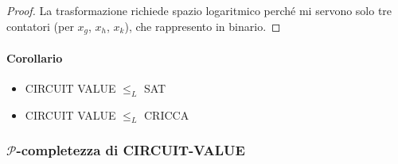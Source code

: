 \documentclass[a4paper,10pt,oneside]{article}
\theoremstyle{break}
\begin{document}
\begin{mdframed}
\begin{proof}
 La trasformazione richiede spazio logaritmico perché mi servono solo tre contatori (per $x_g$, $x_h$, $x_k$), che rappresento in binario.
\end{proof}

\dotfill

\paragraph{Corollario}
\begin{itemize}
 \item CIRCUIT VALUE $\leq_L$ SAT
 \item CIRCUIT VALUE $\leq_L$ CRICCA
\end{itemize}
\end{mdframed}

\newpage
\subsubsection{$\mathcal P$-completezza di CIRCUIT-VALUE}
\end{document}
